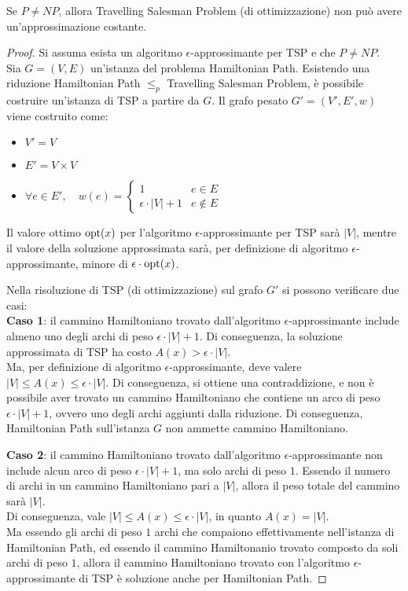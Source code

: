 \begin{thm}
    Se $P \neq NP$, allora Travelling Salesman Problem (di ottimizzazione)
    non può avere un'approssimazione costante.
\end{thm}

\begin{proof}
    Si assuma esista un algoritmo $\epsilon$-approssimante per TSP e che
    $P \neq NP$.\\
    Sia $G = (V, E)$ un'istanza del problema Hamiltonian Path.
    Esistendo una riduzione Hamiltonian Path $\le_p$ Travelling Salesman
    Problem, è possibile costruire un'istanza di TSP a partire da $G$.
    Il grafo pesato $G' = (V', E', w)$ viene costruito come:
    \begin{itemize}
        \item $V' = V$
        \item $E' = V \times V$
        \item $\forall e \in E', \quad w(e) = \begin{cases}
            1 & e \in E\\
            \epsilon \cdot |V| + 1 & e \notin E
        \end{cases}$
    \end{itemize}
    Il valore ottimo $\textnormal{opt}(x)$ per l'algoritmo $\epsilon$-approssimante per
    TSP sarà $|V|$, mentre il valore della soluzione approssimata sarà,
    per definizione di algoritmo $\epsilon$-approssimante,
    minore di $\epsilon \cdot \textnormal{opt}(x)$.

    Nella risoluzione di TSP (di ottimizzazione) sul grafo $G'$ si possono
    verificare due casi:\\
    \textbf{Caso 1}: il cammino Hamiltoniano trovato dall'algoritmo
    $\epsilon$-approssimante include almeno uno degli archi di peso
    $\epsilon \cdot |V| + 1$.
    Di conseguenza, la soluzione approssimata di TSP ha costo
    $A(x) > \epsilon \cdot |V|$.\\
    Ma, per definizione di algoritmo $\epsilon$-approssimante,
    deve valere $|V| \le A(x) \le \epsilon \cdot |V|$.
    Di conseguenza, si ottiene una contraddizione, e non è possibile aver
    trovato un cammino Hamiltoniano che contiene un arco di peso
    $\epsilon \cdot |V| + 1$, ovvero uno degli archi aggiunti dalla riduzione.
    Di conseguenza, Hamiltonian Path sull'istanza $G$ non ammette cammino
    Hamiltoniano.

    \textbf{Caso 2}: il cammino Hamiltoniano trovato dall'algoritmo
    $\epsilon$-approssimante non include alcun arco di peso
    $\epsilon \cdot |V| + 1$, ma solo archi di peso $1$.
    Essendo il numero di archi in un cammino Hamiltoniano pari a $|V|$,
    allora il peso totale del cammino sarà $|V|$.\\
    Di conseguenza, vale $|V| \le A(x) \le \epsilon \cdot |V|$,
    in quanto $A(x) = |V|$.\\
    Ma essendo gli archi di peso $1$ archi che compaiono effettivamente
    nell'istanza di Hamiltonian Path, ed essendo il cammino Hamiltonanio
    trovato composto da soli archi di peso $1$, allora il cammino Hamiltoniano
    trovato con l'algoritmo $\epsilon$-approssimante di TSP è
    soluzione anche per Hamiltonian Path.


\end{proof}
